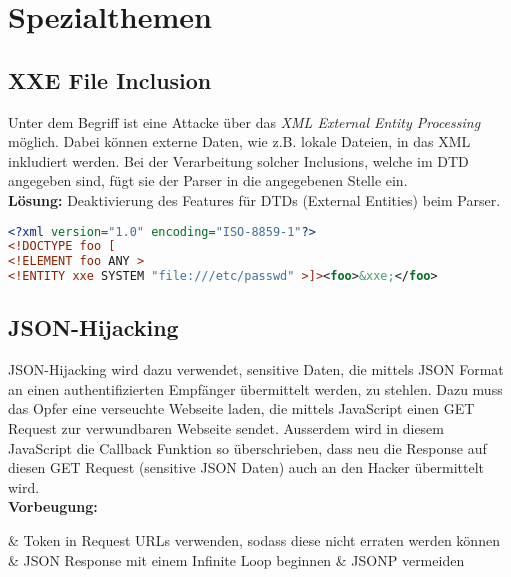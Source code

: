 \section{Spezialthemen}


\subsection{XXE File Inclusion}
Unter dem Begriff ist eine Attacke über das \textit{XML External Entity Processing} möglich. Dabei können externe Daten, wie z.B. lokale Dateien, in das XML inkludiert werden. Bei der Verarbeitung solcher Inclusions, welche im DTD angegeben sind, fügt sie der Parser in die angegebenen Stelle ein.\\

\textbf{Lösung:} Deaktivierung des Features für DTDs (External Entities) beim Parser.

\begin{lstlisting}[language=XML, caption=Beispiel der XXE]
<?xml version="1.0" encoding="ISO-8859-1"?>
<!DOCTYPE foo [  
<!ELEMENT foo ANY >
<!ENTITY xxe SYSTEM "file:///etc/passwd" >]><foo>&xxe;</foo>
\end{lstlisting}

\subsection{JSON-Hijacking}
JSON-Hijacking wird dazu verwendet, sensitive Daten, die mittels JSON Format an einen authentifizierten Empfänger übermittelt werden, zu stehlen. Dazu muss das Opfer eine verseuchte Webseite laden, die mittels JavaScript einen GET Request zur verwundbaren Webseite sendet. Ausserdem wird in diesem JavaScript die Callback Funktion so überschrieben, dass neu die Response auf diesen GET Request (sensitive JSON Daten) auch an den Hacker übermittelt wird. \\

\textbf{Vorbeugung:}
\begin{easylist}
	& Token in Request URLs verwenden, sodass diese nicht erraten werden können
	& JSON Response mit einem Infinite Loop beginnen
	& JSONP vermeiden
\end{easylist} 

